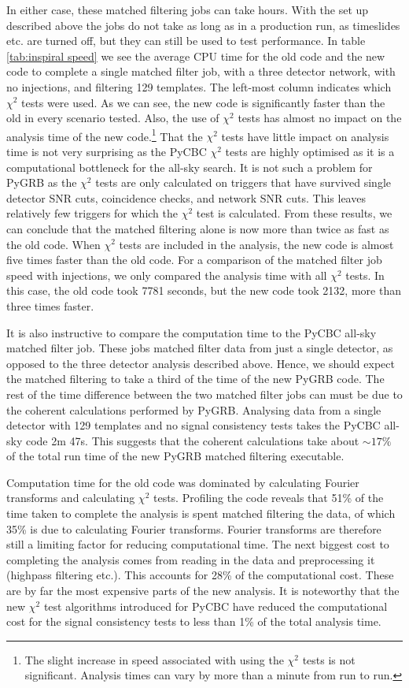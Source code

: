 \documentclass[11pt]{cuthesis}
\begin{document}
In either case, these matched filtering jobs can take hours. With the set up described above the jobs do not take as long as in a production run, as timeslides etc. are turned off, but they can still be used to test performance. In table \ref{tab:inspiral speed} we see the average CPU time for the old code and the new code to complete a single matched filter job, with a three detector network, with no injections, and filtering 129 templates. The left-most column indicates which $\chi^2$ tests were used. As we can see, the new code is significantly faster than the old in every scenario tested. Also, the use of $\chi^2$ tests has almost no impact on the analysis time of the new code.\footnote{The slight increase in speed associated with using the $\chi^2$ tests is not significant. Analysis times can vary by more than a minute from run to run.} That the $\chi^2$ tests have little impact on analysis time is not very surprising as the PyCBC $\chi^2$ tests are highly optimised as it is a computational bottleneck for the all-sky search. It is not such a problem for PyGRB as the $\chi^2$ tests are only calculated on triggers that have survived single detector SNR cuts, coincidence checks, and network SNR cuts. This leaves relatively few triggers for which the $\chi^2$ test is calculated. From these results, we can conclude that the matched filtering alone is now more than twice as fast as the old code. When $\chi^2$ tests are included in the analysis, the new code is almost five times faster than the old code. For a comparison of the matched filter job speed with injections, we only compared the analysis time with all $\chi^2$ tests. In this case, the old code took 7781 seconds, but the new code took 2132, more than three times faster. 

It is also instructive to compare the computation time to the PyCBC all-sky matched filter job. These jobs matched filter data from just a single detector, as opposed to the three detector analysis described above. Hence, we should expect the matched filtering to take a third of the time of the new PyGRB code. The rest of the time difference between the two matched filter jobs can must be due to the coherent calculations performed by PyGRB. Analysing data from a single detector with 129 templates and no signal consistency tests takes the PyCBC all-sky code 2m 47s. This suggests that the coherent calculations take about $\sim17\%$ of the total run time of the new PyGRB matched filtering executable.

Computation time for the old code was dominated by calculating Fourier transforms and calculating $\chi^2$ tests. Profiling the code reveals that 51\% of the time taken to complete the analysis is spent matched filtering the data, of which 35\% is due to calculating Fourier transforms. Fourier transforms are therefore still a limiting factor for reducing computational time. The next biggest cost to completing the analysis comes from reading in the data and preprocessing it (highpass filtering etc.). This accounts for 28\% of the computational cost. These are by far the most expensive parts of the new analysis. It is noteworthy that the new $\chi^2$ test algorithms introduced for PyCBC have reduced the computational cost for the signal consistency tests to less than 1\% of the total analysis time.
\end{document}
